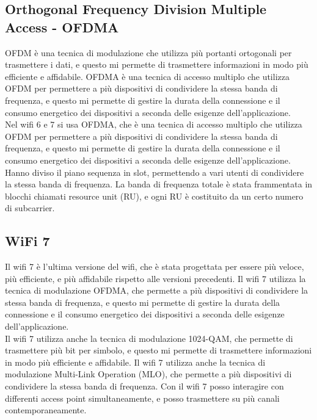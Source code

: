 \subsection{Orthogonal Frequency Division Multiple Access - OFDMA}
OFDM è una tecnica di modulazione che utilizza più portanti ortogonali per trasmettere i dati, e questo mi permette di trasmettere informazioni in modo più efficiente e affidabile. OFDMA è una tecnica di accesso multiplo che utilizza OFDM per permettere a più dispositivi di condividere la stessa banda di frequenza, e questo mi permette di gestire la durata della connessione e il consumo energetico dei dispositivi a seconda delle esigenze dell'applicazione.\\
Nel wifi 6 e 7 si usa OFDMA, che è una tecnica di accesso multiplo che utilizza OFDM per permettere a più dispositivi di condividere la stessa banda di frequenza, e questo mi permette di gestire la durata della connessione e il consumo energetico dei dispositivi a seconda delle esigenze dell'applicazione. Hanno diviso il piano sequenza in slot, permettendo a vari utenti di condividere la stessa banda di frequenza.
La banda di frequenza totale è stata frammentata in blocchi chiamati resource unit (RU), e ogni RU è costituito da un certo numero di subcarrier. 

\subsection{WiFi 7}
Il wifi 7 è l'ultima versione del wifi, che è stata progettata per essere più veloce, più efficiente, e più affidabile rispetto alle versioni precedenti. Il wifi 7 utilizza la tecnica di modulazione OFDMA, che permette a più dispositivi di condividere la stessa banda di frequenza, e questo mi permette di gestire la durata della connessione e il consumo energetico dei dispositivi a seconda delle esigenze dell'applicazione.\\
Il wifi 7 utilizza anche la tecnica di modulazione 1024-QAM, che permette di trasmettere più bit per simbolo, e questo mi permette di trasmettere informazioni in modo più efficiente e affidabile. Il wifi 7 utilizza anche la tecnica di modulazione Multi-Link Operation (MLO), che permette a più dispositivi di condividere la stessa banda di frequenza.
Con il wifi 7 posso interagire con differenti access point simultaneamente, e posso trasmettere su più canali contemporaneamente.\\

